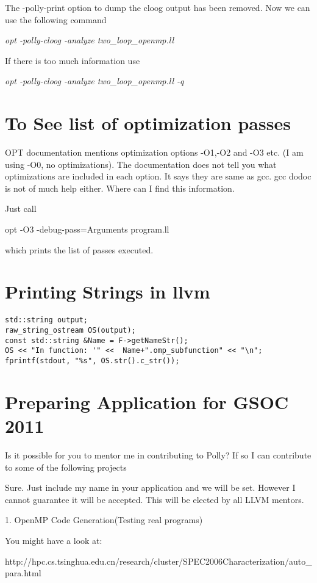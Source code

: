 \documentclass[a4paper,10pt]{article}
\begin{document}
The -polly-print option to dump the cloog output has been removed. Now we can use the following command

\emph{opt -polly-cloog -analyze two\_loop\_openmp.ll}

If there is too much information use

\emph{opt -polly-cloog -analyze two\_loop\_openmp.ll -q}

\section{To See list of optimization passes}

OPT documentation mentions optimization options -O1,-O2 and -O3 etc.
(I am using -O0, no optimizations). The documentation does not tell
 you what optimizations are included in each option.  It says they are
 same as gcc.  gcc dodoc is not of much help either.  Where can I find
 this information.

Just call

opt -O3 -debug-pass=Arguments program.ll

which prints the list of passes executed.

\section{Printing Strings in llvm}

\begin{verbatim}
std::string output;
raw_string_ostream OS(output);
const std::string &Name = F->getNameStr();
OS << "In function: '" <<  Name+".omp_subfunction" << "\n";
fprintf(stdout, "%s", OS.str().c_str());

\end{verbatim}
\section{Preparing Application for GSOC 2011}
Is it possible for you to mentor me in contributing to Polly? If so I
can contribute to some of the following projects

Sure. Just include my name in your application and we will be set. However I cannot guarantee it will be accepted. This will be elected by all LLVM mentors.

1. OpenMP Code Generation(Testing real programs)

	You might have a look at:

	http://hpc.cs.tsinghua.edu.cn/research/cluster/SPEC2006Characterization/auto\_para.html
\end{document}
